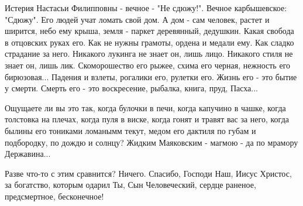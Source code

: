 Истерия Настасьи Филипповны - вечное - "Не сдюжу!". Вечное карбышевское:
"Сдюжу". Его людей учат ломать свой дом. А дом - сам человек, растет и ширится,
небо ему крыша, земля - паркет деревянный, дедушкин. Какая свобода в отцовских
руках его. Как не нужны грамоты, ордена и медали ему. Как сладко страдание за
него. Никакого лукинга не знает он, лишь лицо. Никакого стиля не знает он, лишь
лик. Скоморошество его рыжее, схима его черная, нежность его бирюзовая...
Падения и взлеты, рогалики его, рулетки его. Жизнь его - это бытие у смерти.
Смерть его - это воскресение, рыбалка, книга, пруд, Пасха...

Ощущаете ли вы это так, когда булочки в печи, когда капучино в чашке, когда
толстовка на плечах, когда пуля в виске, когда гонят и травят вас за него,
когда былины его тониками ломанымм текут, медом его дактиля по губам и
подбородку, по дождю и солнцу? Жидким Маяковским - магмою - да по мрамору
Державина...

Разве что-то с этим сравнится? Ничего. Спасибо, Господи Наш, Иисус Христос, за
богатство, которым одарил Ты, Сын Человеческий, сердце раненое, предсмертное,
бесконечное!
